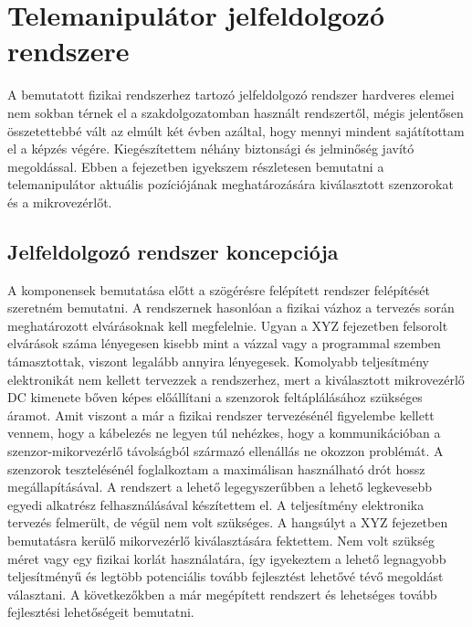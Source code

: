 \chapter{Telemanipulátor jelfeldolgozó rendszere}
\label{sec:LatexTools}

A bemutatott fizikai rendszerhez tartozó jelfeldolgozó rendszer hardveres elemei nem sokban térnek el a szakdolgozatomban használt rendszertől, mégis jelentősen összetettebbé vált az elmúlt két évben azáltal, hogy mennyi mindent sajátítottam el a képzés végére. Kiegészítettem néhány biztonsági és jelminőség javító megoldással. Ebben a fejezetben igyekszem részletesen bemutatni a telemanipulátor aktuális pozíciójának meghatározására kiválasztott szenzorokat és a mikrovezérlőt.

\section{Jelfeldolgozó rendszer koncepciója}

A komponensek bemutatása előtt a szögérésre felépített rendszer felépítését szeretném bemutatni. A rendszernek hasonlóan a fizikai vázhoz a tervezés során meghatározott elvárásoknak kell megfelelnie. Ugyan a XYZ fejezetben felsorolt elvárások száma lényegesen kisebb mint a vázzal vagy a programmal szemben támasztottak, viszont legalább annyira lényegesek. Komolyabb teljesítmény elektronikát nem kellett tervezzek a rendszerhez, mert a kiválasztott mikrovezérlő DC kimenete bőven képes előállítani a szenzorok feltáplálásához szükséges áramot. Amit viszont a már a fizikai rendszer tervezésénél figyelembe kellett vennem, hogy a kábelezés ne legyen túl nehézkes, hogy a kommunikációban a szenzor-mikorvezérlő távolságból származó ellenállás ne okozzon problémát. A szenzorok tesztelésénél foglalkoztam a maximálisan használható drót hossz megállapításával. A rendszert a lehető legegyszerűbben a lehető legkevesebb egyedi alkatrész felhasználásával készítettem el. A teljesítmény elektronika tervezés felmerült, de végül nem volt szükséges. A hangsúlyt a XYZ fejezetben bemutatásra kerülő mikorvezérlő kiválasztására fektettem. Nem volt szükség méret vagy egy fizikai korlát használatára, így igyekeztem a lehető legnagyobb teljesítményű és legtöbb potenciális tovább fejlesztést lehetővé tévő megoldást választani. A következőkben a már megépített rendszert és lehetséges tovább fejlesztési lehetőségeit bemutatni.

